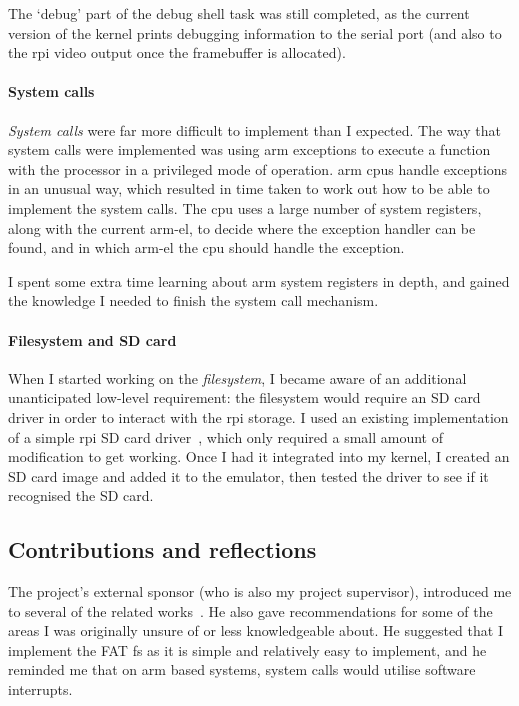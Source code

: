 \documentclass{article}
\begin{document}
The `debug' part of the debug shell task was still completed, as the current
version of the kernel prints debugging information to the serial port (and also
to the \gls{rpi} video output once the framebuffer is allocated).

\paragraph{System calls}
\emph{System calls} were far more difficult to implement than I expected. The
way that system calls were implemented was using \gls{arm} exceptions
to execute a function with the processor in a privileged mode of operation.
\gls{arm} \glspl{cpu} handle exceptions in an unusual way, which resulted in
time taken to work out how to be able to implement the system calls. The
\gls{cpu} uses a large number of system registers, along with the current
\gls{arm-el}, to decide where the exception handler can be found, and in which
\gls{arm-el} the \gls{cpu} should handle the exception.

I spent some extra time learning about \gls{arm} system registers in depth, and
gained the knowledge I needed to finish the system call mechanism.

\paragraph{Filesystem and SD card}
When I started working on the \emph{filesystem}, I became aware of an
additional unanticipated low-level requirement: the filesystem would require an
SD card driver in order to interact with the \gls{rpi} storage. I used an
existing implementation of a simple \gls{rpi} SD card
driver~\cite{rpi-boot-gh}, which only required a small amount of modification
to get working. Once I had it integrated into my kernel, I created an SD card
image and added it to the emulator, then tested the driver to see if it
recognised the SD card.

\subsection{Contributions and reflections}
The project's external sponsor (who is also my project supervisor), introduced
me to several of the related works~\cite{netBSD-git, riscOS-source}. He also
gave recommendations for some of the areas I was originally unsure of or less
knowledgeable about. He suggested that I implement the FAT \gls{fs} as it is
simple and relatively easy to implement, and he reminded me that on \gls{arm}
based systems, system calls would utilise software interrupts.
\end{document}
